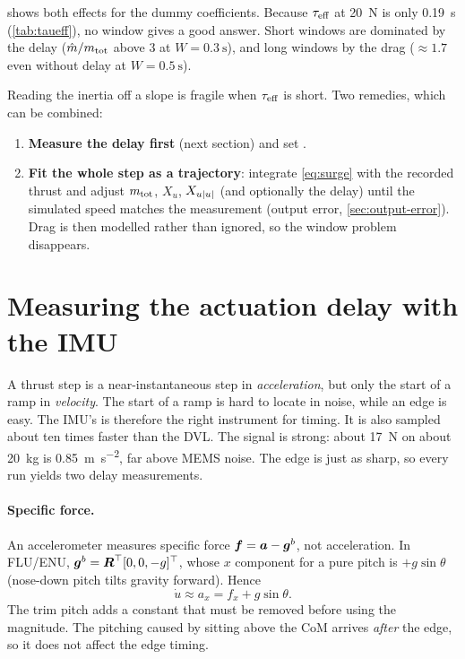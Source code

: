  shows both effects for the dummy coefficients. Because $\tau_\mathrm{eff}$ at
\qty{20}{\newton} is only \qty{0.19}{\second} (\cref{tab:taueff}), no window gives a good
answer. Short windows are dominated by the delay ($\hat m/m_\mathrm{tot}$ above 3 at
$W = \qty{0.3}{\second}$), and long windows by the drag ($\approx1.7$ even without delay
at $W = \qty{0.5}{\second}$).

\begin{keyidea}
Reading the inertia off a slope is fragile when $\tau_\mathrm{eff}$ is short. Two remedies, which can be combined:
\begin{enumerate}[nosep]
  \item \textbf{Measure the delay first} (next section) and set .
  \item \textbf{Fit the whole step as a trajectory}: integrate \eqref{eq:surge} with the
        recorded thrust and adjust $m_\mathrm{tot}$, $X_u$, $X_{u|u|}$ (and optionally the delay) until the
        simulated speed matches the measurement (output error, \cref{sec:output-error}). Drag
        is then modelled rather than ignored, so the window problem disappears.
\end{enumerate}
\end{keyidea}

\section{Measuring the actuation delay with the IMU}

A thrust step is a near-instantaneous step in \emph{acceleration}, but only the start of a
ramp in \emph{velocity}. The start of a ramp is hard to locate in noise, while an edge is easy.
The IMU's  is therefore the right instrument for timing. It is
also sampled about ten times faster than the DVL. The signal is strong: about
\qty{17}{\newton} on about \qty{20}{\kilogram} is \qty{0.85}{\meter\per\second\squared}, far
above MEMS noise. The  edge is just as sharp, so every run yields two delay
measurements.

\paragraph{Specific force.} An accelerometer measures specific force
$\boldsymbol{f} = \boldsymbol{a} - \boldsymbol{g}^b$, not acceleration. In FLU/ENU,
$\boldsymbol{g}^b = \boldsymbol{R}^\top[0,0,-g]^\top$, whose $x$ component for a pure pitch is
$+g\sin\theta$ (nose-down pitch tilts gravity forward). Hence
\begin{equation}
  \dot u \approx a_x = f_x + g\sin\theta .
\end{equation}
The trim pitch adds a constant that must be removed before using the magnitude. The pitching
caused by  sitting above the CoM arrives \emph{after} the edge, so it does not
affect the edge timing.

